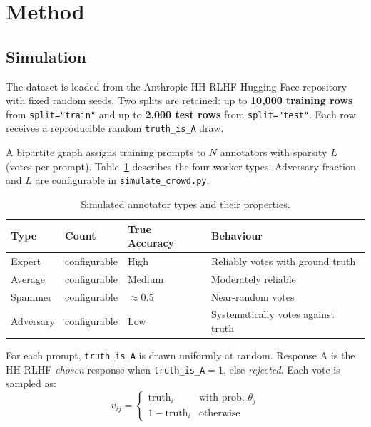 \documentclass[11pt, a4paper]{article}
\begin{document}
\newpage

\section{Method}

\subsection{Simulation}

The dataset is loaded from the Anthropic HH-RLHF Hugging Face repository with fixed
random seeds. Two splits are retained: up to \textbf{10,000 training rows} from
\texttt{split="train"} and up to \textbf{2,000 test rows} from \texttt{split="test"}.
Each row receives a reproducible random \texttt{truth\_is\_A} draw.

A bipartite graph assigns training prompts to $N$ annotators with sparsity $L$
(votes per prompt). Table~\ref{tab:workers} describes the four worker types.
Adversary fraction and $L$ are configurable in \texttt{simulate\_crowd.py}.

\begin{table}[H]
  \centering
  \caption{Simulated annotator types and their properties.}
  \label{tab:workers}
  \begin{tabular}{llll}
    \toprule
    \textbf{Type} & \textbf{Count} & \textbf{True Accuracy} & \textbf{Behaviour} \\
    \midrule
    Expert    & configurable & High         & Reliably votes with ground truth \\
    Average   & configurable & Medium       & Moderately reliable \\
    Spammer   & configurable & $\approx$0.5 & Near-random votes \\
    Adversary & configurable & Low          & Systematically votes against truth \\
    \bottomrule
  \end{tabular}
\end{table}

For each prompt, \texttt{truth\_is\_A} is drawn uniformly at random. Response A is the
HH-RLHF \textit{chosen} response when \texttt{truth\_is\_A}$=1$, else \textit{rejected}.
Each vote is sampled as:
\[
  v_{ij} = \begin{cases} \text{truth}_i & \text{with prob. } \theta_j \\ 1-\text{truth}_i & \text{otherwise} \end{cases}
\]
\end{document}
